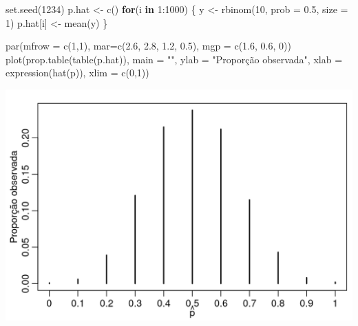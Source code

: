 \documentclass[
  10pt,
  a4paper]{book}
\newenvironment{Shaded}{\begin{snugshade}}{\end{snugshade}}
\newcommand{\AttributeTok}[1]{\textcolor[rgb]{0.77,0.63,0.00}{#1}}
\newcommand{\ControlFlowTok}[1]{\textcolor[rgb]{0.13,0.29,0.53}{\textbf{#1}}}
\newcommand{\DecValTok}[1]{\textcolor[rgb]{0.00,0.00,0.81}{#1}}
\newcommand{\FloatTok}[1]{\textcolor[rgb]{0.00,0.00,0.81}{#1}}
\newcommand{\FunctionTok}[1]{\textcolor[rgb]{0.00,0.00,0.00}{#1}}
\newcommand{\NormalTok}[1]{#1}
\newcommand{\OtherTok}[1]{\textcolor[rgb]{0.56,0.35,0.01}{#1}}
\newcommand{\SpecialCharTok}[1]{\textcolor[rgb]{0.00,0.00,0.00}{#1}}
\newcommand{\StringTok}[1]{\textcolor[rgb]{0.31,0.60,0.02}{#1}}
\begin{document}
\begin{Shaded}
\begin{Highlighting}[]
\FunctionTok{set.seed}\NormalTok{(}\DecValTok{1234}\NormalTok{)}
\NormalTok{p.hat }\OtherTok{\textless{}{-}} \FunctionTok{c}\NormalTok{()}
\ControlFlowTok{for}\NormalTok{(i }\ControlFlowTok{in} \DecValTok{1}\SpecialCharTok{:}\DecValTok{1000}\NormalTok{) \{}
\NormalTok{  y }\OtherTok{\textless{}{-}} \FunctionTok{rbinom}\NormalTok{(}\DecValTok{10}\NormalTok{, }\AttributeTok{prob =} \FloatTok{0.5}\NormalTok{, }\AttributeTok{size =} \DecValTok{1}\NormalTok{)}
\NormalTok{  p.hat[i] }\OtherTok{\textless{}{-}} \FunctionTok{mean}\NormalTok{(y)}
\NormalTok{\}}
\end{Highlighting}
\end{Shaded}

\begin{Shaded}
\begin{Highlighting}[]
\FunctionTok{par}\NormalTok{(}\AttributeTok{mfrow =} \FunctionTok{c}\NormalTok{(}\DecValTok{1}\NormalTok{,}\DecValTok{1}\NormalTok{), }\AttributeTok{mar=}\FunctionTok{c}\NormalTok{(}\FloatTok{2.6}\NormalTok{, }\FloatTok{2.8}\NormalTok{, }\FloatTok{1.2}\NormalTok{, }\FloatTok{0.5}\NormalTok{), }\AttributeTok{mgp =} \FunctionTok{c}\NormalTok{(}\FloatTok{1.6}\NormalTok{, }\FloatTok{0.6}\NormalTok{, }\DecValTok{0}\NormalTok{))}
\FunctionTok{plot}\NormalTok{(}\FunctionTok{prop.table}\NormalTok{(}\FunctionTok{table}\NormalTok{(p.hat)), }\AttributeTok{main =} \StringTok{""}\NormalTok{, }
     \AttributeTok{ylab =} \StringTok{"Proporção observada"}\NormalTok{,}
     \AttributeTok{xlab =} \FunctionTok{expression}\NormalTok{(}\FunctionTok{hat}\NormalTok{(p)), }\AttributeTok{xlim =} \FunctionTok{c}\NormalTok{(}\DecValTok{0}\NormalTok{,}\DecValTok{1}\NormalTok{))}
\end{Highlighting}
\end{Shaded}

\begin{center}\includegraphics{figures/unnamed-chunk-382-1} \end{center}
\end{document}
